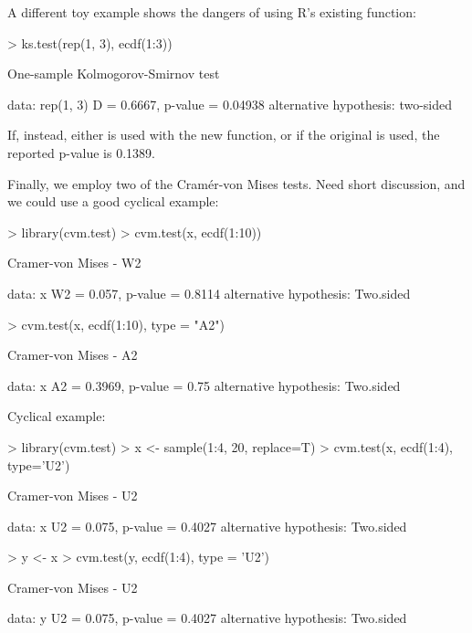 A different toy example shows the dangers of using R's existing
 function:
\begin{Schunk}
\begin{Sinput}
> ks.test(rep(1, 3), ecdf(1:3))
\end{Sinput}
\begin{Soutput}
	One-sample Kolmogorov-Smirnov test

data:  rep(1, 3) 
D = 0.6667, p-value = 0.04938
alternative hypothesis: two-sided 
\end{Soutput}
\end{Schunk}
If, instead, either  is used with the new
 function, or if the original 
is used, the reported p-value is 0.1389.

Finally, we employ two of the Cram\'{e}r-von Mises tests.  Need short discussion,
and we could use a good cyclical example:
\begin{Schunk}
\begin{Sinput}
> library(cvm.test)
> cvm.test(x, ecdf(1:10))
\end{Sinput}
\begin{Soutput}
	Cramer-von Mises - W2

data:  x 
W2 = 0.057, p-value = 0.8114
alternative hypothesis: Two.sided 
\end{Soutput}
\begin{Sinput}
> cvm.test(x, ecdf(1:10), type = "A2")
\end{Sinput}
\begin{Soutput}
	Cramer-von Mises - A2

data:  x 
A2 = 0.3969, p-value = 0.75
alternative hypothesis: Two.sided 
\end{Soutput}
\end{Schunk}

Cyclical example:

\begin{Schunk}
\begin{Sinput}
> library(cvm.test)
> x <- sample(1:4, 20, replace=T)
> cvm.test(x, ecdf(1:4), type='U2')
\end{Sinput}
\begin{Soutput}
	Cramer-von Mises - U2

data:  x 
U2 = 0.075, p-value = 0.4027
alternative hypothesis: Two.sided 
\end{Soutput}
\begin{Sinput}
> y <- x%
> cvm.test(y, ecdf(1:4), type = 'U2')
\end{Sinput}
\begin{Soutput}
	Cramer-von Mises - U2

data:  y 
U2 = 0.075, p-value = 0.4027
alternative hypothesis: Two.sided 
\end{Soutput}
\end{Schunk}




